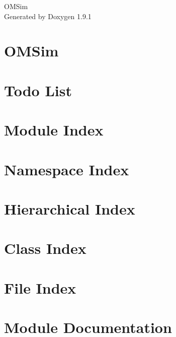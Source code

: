 \let\mypdfximage\pdfximage\def\pdfximage{\immediate\mypdfximage}\documentclass[twoside]{book}
\newcommand{\+}{\discretionary{\mbox{\scriptsize$\hookleftarrow$}}{}{}}
\newcommand{\clearemptydoublepage}{%
  \newpage{\pagestyle{empty}\cleardoublepage}%
}
\begin{document}
\raggedbottom

\hypersetup{pageanchor=false,
             bookmarksnumbered=true,
             pdfencoding=unicode
            }
\begin{titlepage}
\vspace*{7cm}
\begin{center}%
{\Large OMSim }\\
\vspace*{1cm}
{\large Generated by Doxygen 1.9.1}\\
\end{center}
\end{titlepage}
\clearemptydoublepage
{}
\tableofcontents
\clearemptydoublepage
{}
\hypersetup{pageanchor=true}

\chapter{OMSim}
\label{index}\hypertarget{index}{}
\chapter{Todo List}
\label{todo}

\chapter{Module Index}

\chapter{Namespace Index}

\chapter{Hierarchical Index}

\chapter{Class Index}

\chapter{File Index}

\chapter{Module Documentation}



\end{document}
